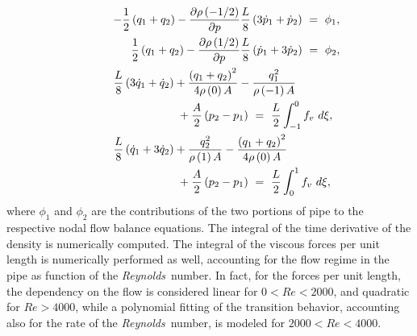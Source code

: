 \documentclass[10pt,dvips,fleqn,subeqn]{report}
\begin{document}
\begin{eqnarray*}
    \lefteqn{
    - \frac{1}{2}\plbr{
        q_1 + q_2
    } - \frac{\partial\rho\plbr{-1/2}}{\partial{p}}\frac{L}{8}\plbr{
        3 \dot{p}_1 + \dot{p}_2
    } \ = \ \phi_1 , 
    } \hspace{60mm} \\
    \lefteqn{
    \frac{1}{2}\plbr{
        q_1 + q_2
    } - \frac{\partial\rho\plbr{1/2}}{\partial{p}}\frac{L}{8}\plbr{
        \dot{p}_1 + 3 \dot{p}_2
    } \ = \ \phi_2 , 
    } \hspace{54.5mm} \\
    \lefteqn{
    \frac{L}{8}\plbr{
        3 \dot{q}_1 + \dot{q}_2
    } + %
    \frac{\plbr{q_1+q_2}^2}{4\rho\plbr{0}A}
    - \frac{q_1^2}{\rho\plbr{-1}A}
    } \hspace{60mm} \\
    \lefteqn{
    \mbox{} + \frac{A}{2}\plbr{
        p_2 - p_1
    } \ = \ \frac{L}{2}\intg{-1}{0}{f_v}{d\xi} , 
    } \hspace{40mm} \\
    \lefteqn{
    \frac{L}{8}\plbr{
        \dot{q}_1 + 3 \dot{q}_2
    } + \frac{q_2^2}{\rho\plbr{1}A}
    - %
    \frac{\plbr{q_1+q_2}^2}{4\rho\plbr{0}A}
    } \hspace{60mm} \\
    \lefteqn{
    \mbox{} + \frac{A}{2}\plbr{
        p_2 - p_1
    } \ = \ \frac{L}{2}\intg{0}{1}{f_v}{d\xi} ,
    } \hspace{40mm}
\end{eqnarray*}
where $\phi_1$ and $\phi_2$ are the contributions of the two portions of
pipe to the respective nodal flow balance equations.
The integral of the time derivative of the density is numerically computed.
The integral of the viscous forces per unit length is numerically performed
as well, accounting for the flow regime in the pipe as function of the
{\em Reynolds}\ number.
In fact, for the forces per unit length, the dependency on the flow is
considered linear for $0<Re<2000$, and quadratic for $Re>4000$, while a
polynomial fitting of the transition behavior, accounting also for the rate
of the {\em Reynolds}\ number, is modeled for $2000<Re<4000$.
\end{document}
